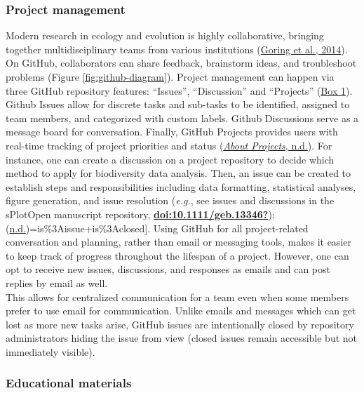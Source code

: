 \hypertarget{project-management}{%
\subsubsection{Project management}\label{project-management}}

Modern research in ecology and evolution is highly collaborative, bringing together multidisciplinary teams from various institutions (\protect\hyperlink{ref-1HhzKAC1K}{Goring et al., 2014}).
On GitHub, collaborators can share feedback, brainstorm ideas, and troubleshoot problems (Figure \ref{fig:github-diagram}).
Project management can happen via three GitHub repository features: ``Issues'', ``Discussion'' and ``Projects'' (\protect\hyperlink{definitions}{Box 1}).
Github Issues allow for discrete tasks and sub-tasks to be identified, assigned to team members, and categorized with custom labels.
Github Discussions serve as a message board for conversation.
Finally, GitHub Projects provides users with real-time tracking of project priorities and status (\protect\hyperlink{ref-RhBKe0MG}{\emph{About Projects}, n.d.}).
For instance, one can create a discussion on a project repository to decide which method to apply for biodiversity data analysis.
Then, an issue can be created to establish steps and responsibilities including data formatting, statistical analyses, figure generation, and issue resolution (\emph{e.g.}, see issues and discussions in the sPlotOpen manuscript repository, \protect\hyperlink{ref-doi:10.1111ux2fgeb.13346}{\textbf{doi:10.1111/geb.13346?}}); (\protect\hyperlink{ref-3UAritXO}{n.d.})=is\%3Aissue+is\%3Aclosed{]}.
Using GitHub for all project-related conversation and planning, rather than email or messaging tools, makes it easier to keep track of progress throughout the lifespan of a project.
However, one can opt to receive new issues, discussions, and responses as emails and can post replies by email as well.\\
This allows for centralized communication for a team even when some members prefer to use email for communication.
Unlike emails and messages which can get lost as more new tasks arise, GitHub issues are intentionally closed by repository administrators hiding the issue from view (closed issues remain accessible but not immediately visible).

\hypertarget{educational-materials}{%
\subsubsection{Educational materials}\label{educational-materials}}

